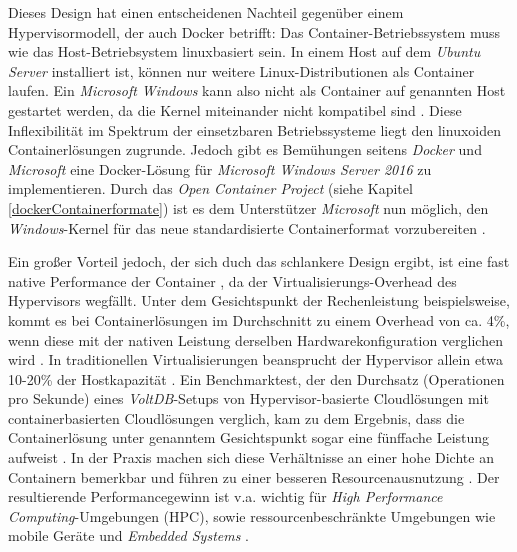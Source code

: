 \documentclass[../main.tex]{subfiles}
\begin{document}
			Dieses Design hat einen entscheidenen Nachteil gegenüber einem Hypervisormodell, der auch Docker betrifft: Das Container-Betriebssystem muss wie das Host-Betriebsystem linuxbasiert sein. In einem Host auf dem \emph{Ubuntu Server} installiert ist, können nur weitere Linux-Distributionen als Container laufen. Ein \emph{Microsoft Windows} kann also nicht als Container auf genannten Host gestartet werden, da die Kernel miteinander nicht kompatibel sind \cite[S.6]{dockerBook}. Diese Inflexibilität im Spektrum der einsetzbaren Betriebssysteme liegt den linuxoiden Containerlösungen zugrunde. Jedoch gibt es Bemühungen seitens \emph{Docker} und \emph{Microsoft} eine Docker-Lösung für \emph{Microsoft Windows Server 2016} zu implementieren. Durch das \emph{Open Container Project} (siehe Kapitel \ref{dockerContainerformate}) ist es dem Unterstützer \emph{Microsoft} nun möglich, den \emph{Windows}-Kernel für das neue standardisierte Containerformat vorzubereiten \cite{dockerWindowsSupport}.

			Ein großer Vorteil jedoch, der sich duch das schlankere Design ergibt, ist eine fast native Performance der Container \cite[S.1]{containerVirtPerformance}, da der Virtualisierungs-Overhead des Hypervisors wegfällt. Unter dem Gesichtspunkt der Rechenleistung beispielsweise, kommt es bei Containerlösungen im Durchschnitt zu einem Overhead von ca. 4\%, wenn diese mit der nativen Leistung derselben Hardwarekonfiguration verglichen wird \cite[S.4]{containerVirtPerformance}\cite[S.5]{IBMcontVMcomparison}. In traditionellen Virtualisierungen beansprucht der Hypervisor allein etwa 10-20\% der Hostkapazität \cite[S.2]{dockerIntroIEEE}\cite[S.5]{IBMcontVMcomparison}. Ein Benchmarktest, der den Durchsatz (Operationen pro Sekunde) eines \emph{VoltDB}-Setups\cite{voltdb} von Hypervisor-basierte Cloudlösungen mit containerbasierten \gls{Cloud}lösungen verglich, kam zu dem Ergebnis, dass die Containerlösung unter genanntem Gesichtspunkt sogar eine fünffache Leistung aufweist \cite[S.2+3]{voltdbBenchmark}.
			In der Praxis machen sich diese Verhältnisse an einer hohe Dichte an Containern bemerkbar und führen zu einer besseren Resourcenausnutzung \cite[S.7+8]{dockerBook}. Der resultierende Performancegewinn ist v.a. wichtig für \emph{High Performance Computing}-Umgebungen (\acrshort{HPC}), sowie ressourcenbeschränkte Umgebungen wie mobile Geräte und \emph{Embedded Systems} \cite[S.1]{dockerSec2}.
\end{document}
